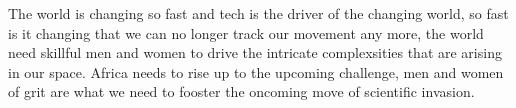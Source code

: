 	The world is changing so fast and tech is the driver of the changing world, so fast is it changing that we can no longer track our movement any more, the world need skillful men and women to drive the intricate complexsities that are arising in our space.
	  Africa needs to rise up to the upcoming challenge, men and women of grit are what we need to fooster the oncoming move of scientific invasion.